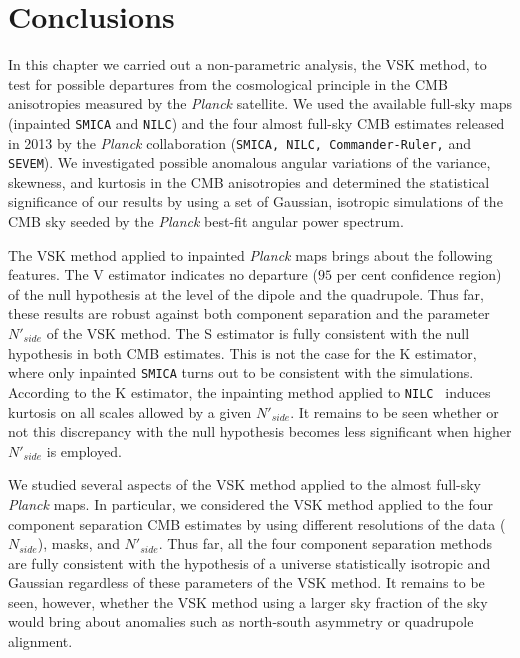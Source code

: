 \section{Conclusions}
\label{s:summary}

In this chapter we carried out a non-parametric analysis, the VSK method, to test for possible departures from the cosmological principle in the CMB anisotropies measured by the \textit{Planck} satellite. We used the available full-sky maps (inpainted \texttt{SMICA} and \texttt{NILC}) and the four almost full-sky CMB estimates released in 2013 by the \textit{Planck} collaboration (\texttt{SMICA, NILC, Commander-Ruler,} and \texttt{SEVEM}). We investigated possible anomalous angular variations of the variance, skewness, and kurtosis in the CMB anisotropies and determined the statistical significance of our results by using a set of Gaussian, isotropic simulations of the CMB sky seeded by the \textit{Planck} best-fit angular power spectrum.    

The VSK method applied to inpainted \textit{Planck} maps brings about the following features. The V estimator indicates no departure ($95$ per cent confidence region) of the null hypothesis at the level of the dipole and the quadrupole. Thus far, these results are robust against both component separation and the parameter $ N'_{side} $ of the VSK method. The S estimator is fully consistent with the null hypothesis in both CMB estimates. This is not the case for the K estimator, where only inpainted \texttt{SMICA} turns out to be consistent with the simulations. According to the K estimator, the inpainting method applied to \texttt{NILC } induces kurtosis on all scales allowed by a given $ N'_{side} $. It remains to be seen  whether or not this discrepancy with the null hypothesis becomes  less significant when higher $ N'_{side} $ is employed.  

We studied several aspects of the VSK method applied to the almost full-sky \textit{Planck} maps. In particular, we considered the VSK method applied to the four component separation CMB estimates by using different resolutions of the data ($ N_{side} $), masks, and $ N'_{side} $. Thus far, all the four component separation methods are fully consistent with the hypothesis of a universe statistically isotropic and Gaussian regardless of these parameters of the VSK method. It remains to be seen, however, whether the VSK method using a larger sky fraction of the sky would bring about anomalies such as north-south asymmetry or quadrupole alignment.    

